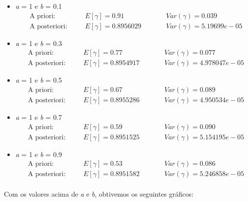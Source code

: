 \documentclass{article}
\begin{document}
\begin{itemize}
					\item \textit{a} = 1 e \textit{b} = 0.1  
						\begin{align*}
							&\text{A priori}: \quad &&E[\gamma] = 0.91  \quad  &&Var(\gamma) = 0.039\\
						 	&\text{A posteriori}: \quad &&E[\gamma] = 0.8956029  \quad \quad &&Var(\gamma) = 5.19699e-05
						\end{align*}					
					
					\item \textit{a} = 1 e \textit{b} = 0.3  
						\begin{align*}
							&\text{A priori}: \quad &&E[\gamma] = 0.77  \quad  &&Var(\gamma) = 0.077\\
						 	&\text{A posteriori}: \quad &&E[\gamma] =  0.8954917  \quad \quad &&Var(\gamma) =4.978047e-05
						\end{align*}					
					
					\item \textit{a} = 1 e \textit{b} = 0.5 
						\begin{align*}
							&\text{A priori}: \quad &&E[\gamma] = 0.67  \quad  &&Var(\gamma) = 0.089\\
						 	&\text{A posteriori}: \quad &&E[\gamma] = 0.8955286  \quad \quad &&Var(\gamma) =4.950534e-05
						\end{align*}						
						 
					\item \textit{a} = 1 e \textit{b} = 0.7  
						\begin{align*}
							&\text{A priori}: \quad &&E[\gamma] = 0.59  \quad  &&Var(\gamma) = 0.090\\
						 	&\text{A posteriori}: \quad &&E[\gamma] =  0.8951525  \quad \quad &&Var(\gamma) =5.154195e-05
						\end{align*}					

					\item \textit{a} = 1 e \textit{b} = 0.9  
						\begin{align*}
							&\text{A priori}: \quad &&E[\gamma] = 0.53  \quad  &&Var(\gamma) = 0.086\\
						 	&\text{A posteriori}: \quad &&E[\gamma] = 0.8951582 \quad \quad &&Var(\gamma) = 5.246858e-05
						\end{align*}					
					\end{itemize}

				\paragraph{}
				Com os valores acima de \textit{a} e \textit{b}, obtivemos os seguintes gráficos:
\end{document}
